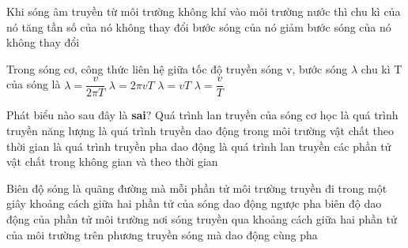 \begin{ex}%
Khi sóng âm truyền từ môi trường không khí vào môi trường nước thì
\choice
{chu kì của nó tăng}
{\True tần số của nó không thay đổi}
{bước sóng của nó giảm}
{bước sóng của nó không thay đổi}
\end{ex} 
\begin{ex}%
 Trong sóng cơ, công thức liên hệ giữa tốc độ truyền sóng v, bước sóng $\lambda $ chu kì T của sóng là
\choice
{$\lambda =\dfrac{v}{2\pi T}$}
{$\lambda =2\pi vT$}
{\True $\lambda =vT$}
{$\lambda =\dfrac{v}{T}$}
\end{ex} 
\begin{ex}%
Phát biểu nào sau đây là \textbf{sai}? Quá trình lan truyền của sóng cơ học
\choice
{là quá trình truyền năng lượng}
{là quá trình truyền dao động trong môi trường vật chất theo thời gian}
{là quá trình truyền pha dao động}
{\True là quá trình lan truyền các phần tử vật chất trong không gian và theo thời gian}
\end{ex} 

\begin{ex}%
Biên độ sóng là
\choice
{quãng đường mà mỗi phần tử môi trường truyền đi trong một giây}
{khoảng cách giữa hai phần tử của sóng dao động ngược pha}
{\True biên độ dao động của phần tử môi trường nơi sóng truyền qua}
{khoảng cách giữa hai phần tử của môi trường trên phương truyền sóng mà dao động cùng pha}
\end{ex} 

